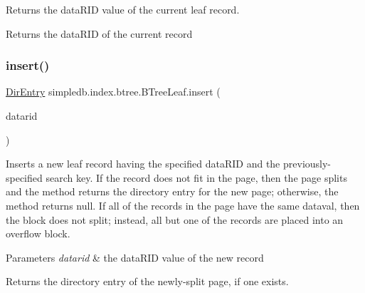 Returns the data\+R\+ID value of the current leaf record. \begin{DoxyReturn}{Returns}
the data\+R\+ID of the current record 
\end{DoxyReturn}
\mbox{\label{classsimpledb_1_1index_1_1btree_1_1BTreeLeaf_aeeaf9ad926466091ff6dc03b62304145}} 
\subsubsection{\texorpdfstring{insert()}{insert()}}
{\footnotesize\ttfamily \hyperlink{classsimpledb_1_1index_1_1btree_1_1DirEntry}{Dir\+Entry} simpledb.\+index.\+btree.\+B\+Tree\+Leaf.\+insert (\begin{DoxyParamCaption}\item[{\hyperlink{classsimpledb_1_1record_1_1RID}{R\+ID}}]{datarid }\end{DoxyParamCaption})\hspace{0.3cm}{\ttfamily [inline]}}

Inserts a new leaf record having the specified data\+R\+ID and the previously-\/specified search key. If the record does not fit in the page, then the page splits and the method returns the directory entry for the new page; otherwise, the method returns null. If all of the records in the page have the same dataval, then the block does not split; instead, all but one of the records are placed into an overflow block. 
\begin{DoxyParams}{Parameters}
{\em datarid} & the data\+R\+ID value of the new record \\
\hline
\end{DoxyParams}
\begin{DoxyReturn}{Returns}
the directory entry of the newly-\/split page, if one exists. 
\end{DoxyReturn}
\mbox{\label{classsimpledb_1_1index_1_1btree_1_1BTreeLeaf_a682895688ae67d02556041c1a5b83c6d}} 
